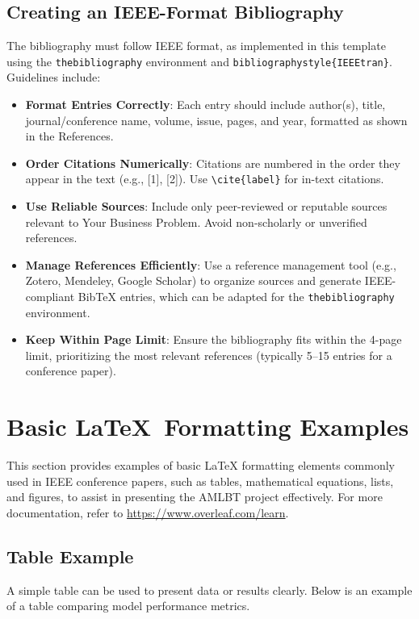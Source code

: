 \documentclass[conference]{IEEEtran}
\begin{document}
\subsection{Creating an IEEE-Format Bibliography}
The bibliography must follow IEEE format, as implemented in this template using the \texttt{thebibliography} environment and \texttt{bibliographystyle\{IEEEtran\}}. Guidelines include:
\begin{itemize}
    \item \textbf{Format Entries Correctly}: Each entry should include author(s), title, journal/conference name, volume, issue, pages, and year, formatted as shown in the References.
    \item \textbf{Order Citations Numerically}: Citations are numbered in the order they appear in the text (e.g., [1], [2]). Use \texttt{\textbackslash cite\{label\}} for in-text citations.
    \item \textbf{Use Reliable Sources}: Include only peer-reviewed or reputable sources relevant to Your Business Problem. Avoid non-scholarly or unverified references.
    \item \textbf{Manage References Efficiently}: Use a reference management tool (e.g., Zotero, Mendeley, Google Scholar) to organize sources and generate IEEE-compliant BibTeX entries, which can be adapted for the \texttt{thebibliography} environment.
    \item \textbf{Keep Within Page Limit}: Ensure the bibliography fits within the 4-page limit, prioritizing the most relevant references (typically 5–15 entries for a conference paper).
\end{itemize}

\section{Basic \LaTeX\ Formatting Examples}
This section provides examples of basic LaTeX formatting elements commonly used in IEEE conference papers, such as tables, mathematical equations, lists, and figures, to assist in presenting the AMLBT project effectively. For more documentation, refer to \url{https://www.overleaf.com/learn}.

\subsection{Table Example}
A simple table can be used to present data or results clearly. Below is an example of a table comparing model performance metrics.
\end{document}
